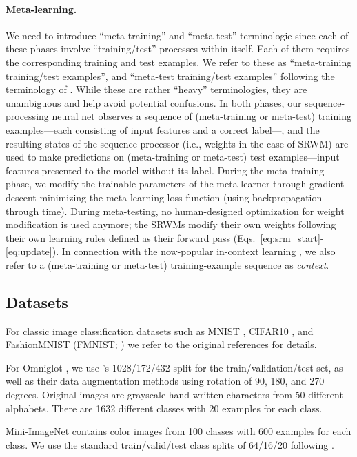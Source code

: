 \documentclass{article}
\begin{document}
\paragraph{Meta-learning.}
We need to introduce ``meta-training'' and ``meta-test'' terminologie since  each of these phases involve ``training/test'' processes within itself.
Each of them requires the corresponding training and test examples.
We refer to these as ``meta-training training/test examples'', and ``meta-test training/test examples'' following the terminology of  \citet{BeaulieuFMLSCC20}.
While these are rather ``heavy'' terminologies, they are unambiguous and help avoid potential confusions.
In both phases, our sequence-processing neural net observes a sequence of (meta-training or meta-test) training examples---each consisting of input features and a correct label---, and the resulting states of the sequence processor (i.e., weights in the case of SRWM) are used to make predictions on (meta-training or meta-test) test examples---input features presented to the model without its label.
During the meta-training phase, we modify the trainable parameters of the meta-learner through gradient descent minimizing the meta-learning loss function (using backpropagation through time).
During meta-testing, no human-designed optimization for weight modification is used anymore; the SRWMs modify their own weights following their own learning rules defined as their forward pass (Eqs.~\ref{eq:srm_start}-\ref{eq:update}).
In connection with the now-popular in-context learning \citep{gpt3}, we also refer to a (meta-training or meta-test) training-example sequence as \textit{context}.


\subsection{Datasets}
\label{app:data}
For classic image classification datasets such as MNIST \citep{lecun1998mnist}, CIFAR10 \citep{krizhevsky}, and FashionMNIST (FMNIST; \citet{xiao2017fashion})
we refer to the original references for details.

For Omniglot \citep{lake2015human}, we use \citet{VinyalsBLKW16}'s 1028/172/432-split for the train/validation/test set, as well as their data augmentation methods using rotation of 90, 180, and 270 degrees.
Original images are grayscale hand-written characters from 50 different alphabets. There are 1632 different classes with 20 examples for each class.

Mini-ImageNet contains color images from 100 classes with 600 examples for each class.
We use the standard train/valid/test class splits of 64/16/20 following \citep{RaviL17}.
\end{document}
